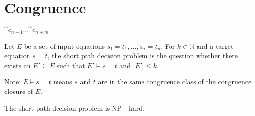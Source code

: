 \chapter*{Congruence}

$\^{c}_{n+1} \ldots \^{c}_{n+m}$

\begin{definition}

Let $E$ be a set of input equations $s_1 = t_1,\ldots,s_n = t_n$.
For $k \in \mathbb{N}$ and a target equation $s = t$, the short path decision problem is the question whether there exists an $E' \subseteq E$ such that $E' \models s = t$ and $|E'| \leq k$.

\end{definition}

Note: $E \models s = t$ means $s$ and $t$ are in the same congruence class of the congruence closure of $E$.

\begin{lemma}

The short path decision problem is NP - hard.

\end{lemma}

